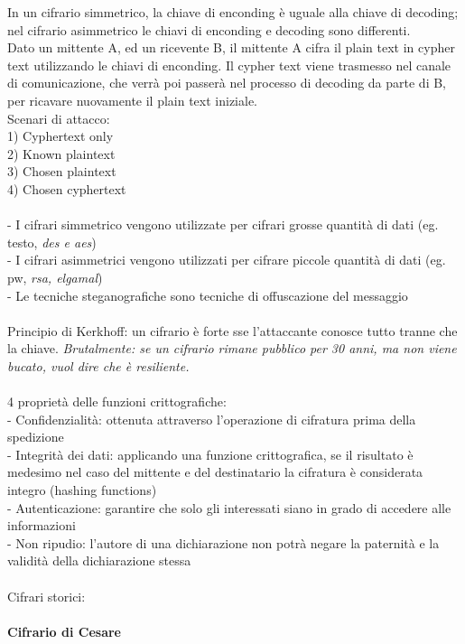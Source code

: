 \documentclass[11pt, oneside]{article}   	%
\begin{document}
In un cifrario simmetrico, la chiave di enconding è uguale alla chiave di decoding; nel cifrario asimmetrico le chiavi di enconding e decoding sono differenti.\\
Dato un mittente A, ed un ricevente B, il mittente A cifra il plain text in cypher text utilizzando le chiavi di enconding. Il cypher text viene trasmesso nel canale di comunicazione, che verrà poi passerà nel processo di decoding da parte di B, per ricavare nuovamente il plain text iniziale. \\
Scenari di attacco:\\
1) Cyphertext only \\ 
2) Known plaintext \\
3) Chosen plaintext \\
4) Chosen cyphertext \\\\
- I cifrari simmetrico vengono utilizzate per cifrari grosse quantità di dati (eg. testo, \emph{des e aes})\\
- I cifrari asimmetrici vengono utilizzati per cifrare piccole quantità di dati (eg. pw, \emph{rsa, elgamal})\\
- Le tecniche steganografiche sono tecniche di offuscazione del messaggio\\\\
Principio di Kerkhoff: un cifrario è forte sse l'attaccante conosce tutto tranne che la chiave. \emph{Brutalmente: se un cifrario rimane pubblico per 30 anni, ma non viene bucato, vuol dire che è resiliente.}\\\\
4 proprietà delle funzioni crittografiche:\\
- Confidenzialità: ottenuta attraverso l'operazione di cifratura prima della spedizione\\
- Integrità dei dati: applicando una funzione crittografica, se il risultato è medesimo nel caso del mittente e del destinatario la cifratura è considerata integro (hashing functions)\\
- Autenticazione: garantire che solo gli interessati siano in grado di accedere alle informazioni\\
- Non ripudio:  l'autore di una dichiarazione non potrà negare la paternità e la validità della dichiarazione stessa\\\\
Cifrari storici:\\\\
\textbf{Cifrario di Cesare} \\
\end{document}

